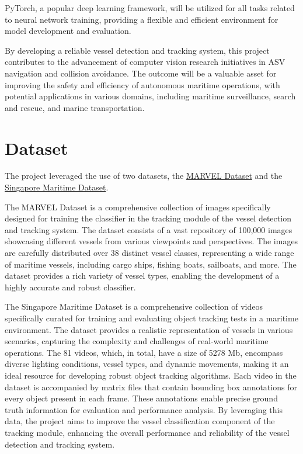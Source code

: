 \documentclass[a4paper,12pt]{article}
\begin{document}
\begin{multicols}{2}
PyTorch, a popular deep learning framework, will be utilized for all tasks related to neural network training, providing a flexible and efficient environment for model development and evaluation.

By developing a reliable vessel detection and tracking system, this project contributes to the advancement of computer vision research initiatives in ASV navigation and collision avoidance. The outcome will be a valuable asset for improving the safety and efficiency of autonomous maritime operations, with potential applications in various domains, including maritime surveillance, search and rescue, and marine transportation.


\section{Dataset}
The project leveraged the use of two datasets, the \href{https://github.com/avaapm/marveldataset2016}{MARVEL Dataset} and the \href{https://sites.google.com/site/dilipprasad/home/singapore-maritime-dataset}{Singapore Maritime Dataset}.

The MARVEL Dataset is a comprehensive collection of images specifically designed for training the classifier in the tracking module of the vessel detection and tracking system. The dataset consists of a vast repository of 100,000 images showcasing different vessels from various viewpoints and perspectives. The images are carefully distributed over 38 distinct vessel classes, representing a wide range of maritime vessels, including cargo ships, fishing boats, sailboats, and more. The dataset provides a rich variety of vessel types, enabling the development of a highly accurate and robust classifier.

The Singapore Maritime Dataset is a comprehensive collection of videos specifically curated for training and evaluating object tracking tests in a maritime environment. The dataset provides a realistic representation of vessels in various scenarios, capturing the complexity and challenges of real-world maritime operations. The 81 videos, which, in total, have a size of 5278 Mb, encompass diverse lighting conditions, vessel types, and dynamic movements, making it an ideal resource for developing robust object tracking algorithms. Each video in the dataset is accompanied by matrix files that contain bounding box annotations for every object present in each frame. These annotations enable precise ground truth information for evaluation and performance analysis. By leveraging this data, the project aims to improve the vessel classification component of the tracking module, enhancing the overall performance and reliability of the vessel detection and tracking system.





\end{multicols}
\end{document}
